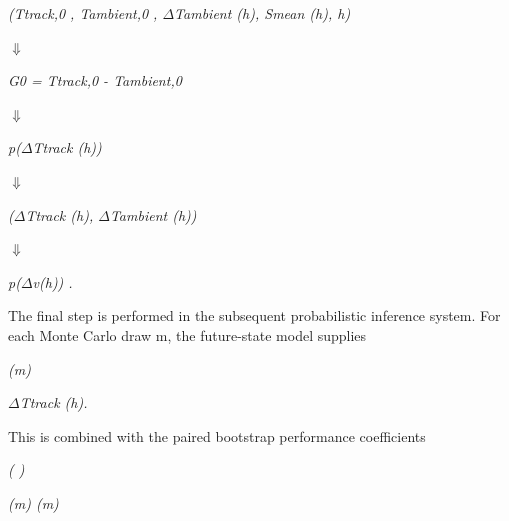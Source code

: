 \begin{center}\textit{(Ttrack,0 , Tambient,0 , \ensuremath{\Delta}Tambient (h), Smean (h), h)}\end{center}

\begin{center}\textit{\ensuremath{\Downarrow}}\end{center}

\begin{center}\textit{G0 = Ttrack,0 - Tambient,0}\end{center}

\begin{center}\textit{\ensuremath{\Downarrow}}\end{center}

\begin{center}\textit{p(\ensuremath{\Delta}Ttrack (h))}\end{center}

\begin{center}\textit{\ensuremath{\Downarrow}}\end{center}

\begin{center}\textit{(\ensuremath{\Delta}Ttrack (h), \ensuremath{\Delta}Tambient (h))}\end{center}

\begin{center}\textit{\ensuremath{\Downarrow}}\end{center}

\begin{center}\textit{p(\ensuremath{\Delta}v(h)) .}\end{center}

The final step is performed in the subsequent probabilistic inference system. For each Monte Carlo draw m, the future-state model supplies

\begin{center}\textit{(m)}\end{center}

\begin{center}\textit{\ensuremath{\Delta}Ttrack (h).}\end{center}

This is combined with the paired bootstrap performance coefficients

\begin{center}\textit{(                         )}\end{center}

\begin{center}\textit{(m)      (m)}\end{center}

